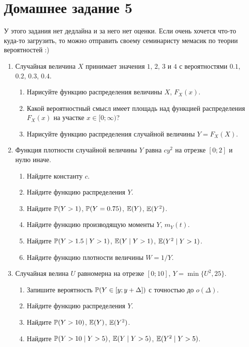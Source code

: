 \section*{Домашнее задание 5}


У этого задания нет дедлайна и за него нет оценки. 
Если очень хочется что-то куда-то загрузить, то можно отправить своему семинаристу мемасик по теории вероятностей :)


\begin{enumerate}
\item Случайная величина $X$ принимает значения $1$, $2$, $3$ и $4$ с вероятностями $0.1$, $0.2$, $0.3$, $0.4$.
\begin{enumerate}
    \item Нарисуйте функцию распределения величины $X$, $F_X(x)$.
    \item Какой вероятностный смысл имеет площадь над функцией распределения $F_X(x)$ на участке $x \in [0;\infty)$?
    \item Нарисуйте функцию распределения случайной величины $Y = F_X(X)$.
\end{enumerate}

\item Функция плотности случайной величины $Y$ равна $c y^2$ на отрезке $[0;2]$ и нулю иначе. 
\begin{enumerate}
    \item Найдите константу $c$. 
    \item Найдите функцию распределения $Y$.
    \item Найдите $\P(Y > 1)$, $\P(Y = 0.75)$, $\E(Y)$, $\E(Y^2)$.
    \item Найдите функцию производящую моменты $Y$, $m_Y(t)$.
    \item Найдите $\P(Y > 1.5 \mid Y > 1)$, $\E(Y \mid Y>1)$, $\E(Y^2 \mid Y > 1)$.
    \item Найдите функцию плотности величины $W = 1 / Y$.
\end{enumerate}

\item Случайная велина $U$ равномерна на отрезке $[0;10]$, $Y = \min \{U^2, 25\}$.
\begin{enumerate}
    \item Запишите вероятность $\P(Y \in [y; y + \Delta])$ с точностью до $o(\Delta)$.
    \item Найдите функцию распределения $Y$.
    \item Найдите $\P(Y > 10)$, $\E(Y)$, $\E(Y^2)$.
    \item Найдите $\P(Y > 10 \mid Y > 5)$, $\E(Y \mid Y>5)$, $\E(Y^2 \mid Y > 5)$.
\end{enumerate}
\end{enumerate}
